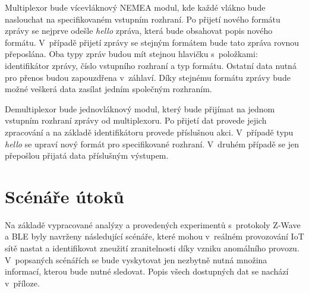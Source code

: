  Multiplexor bude vícevláknový NEMEA modul, kde každé vlákno bude naslouchat na specifikovaném
 vstupním rozhraní. Po přijetí nového formátu zprávy se nejprve odešle \textit{hello} zpráva, která
 bude obsahovat popis nového formátu. V~případě přijetí zprávy se stejným formátem bude tato 
 zpráva rovnou přeposlána. Oba typy zpráv budou mít stejnou hlavičku s~položkami: 
 identifikátor zprávy, 
 číslo vstupního rozhraní a typ formátu. Ostatní data nutná pro přenos budou zapouzdřena
v~záhlaví. Díky stejnému formátu zprávy bude možné veškerá data zasílat jedním společným rozhraním.
 
 Demultiplexor bude jednovláknový modul, který bude přijímat na jednom vstupním rozhraní zprávy
 od multiplexoru. Po přijetí dat provede jejich zpracování a na základě identifikátoru 
 provede příslušnou akci. V~případě typu \textit{hello} se upraví nový formát pro specifikované 
 rozhraní. V~druhém případě se jen přepošlou přijatá data příslušným výstupem.
 
 \newpage
 \section{Scénáře útoků} \label{utoky}
 Na základě vypracované analýzy a provedených experimentů s~protokoly Z-Wave a BLE byly navrženy
 následující scénáře, které mohou v~reálném provozování IoT sítě nastat a identifikovat zneužití
 zranitelnosti díky vzniku anomálního provozu. V~popsaných scénářích se bude vyskytovat jen nezbytně
 nutná množina informací, kterou bude nutné sledovat. Popis všech dostupných dat se nachází v~příloze.
 

